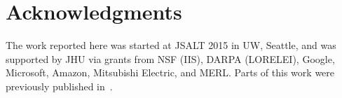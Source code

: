 \section{Acknowledgments}
The work reported here was started at JSALT 2015 in UW, Seattle, and
was supported by JHU via grants from NSF (IIS), DARPA (LORELEI),
Google, Microsoft, Amazon, Mitsubishi Electric, and MERL.  Parts of
this work were previously published in~\cite{Liu15}.
